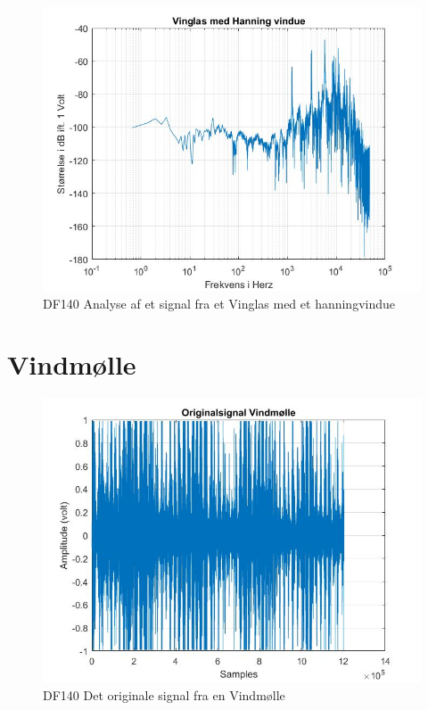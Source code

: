 \begin{figure}[H]
	\centering
	\includegraphics[width=140mm]{figures/Vinglas/hanning.jpg}
	\caption{DF140 Analyse af et signal fra et Vinglas med et hanningvindue}
	\label{fig:Vinglas hanning}
\end{figure}



\section{Vindmølle}
\begin{figure}[H]
	\centering
	\includegraphics[width=140mm]{figures/Vind/original.jpg}
	\caption{DF140 Det originale signal fra en Vindmølle}
	\label{fig:Vind original}
\end{figure}


